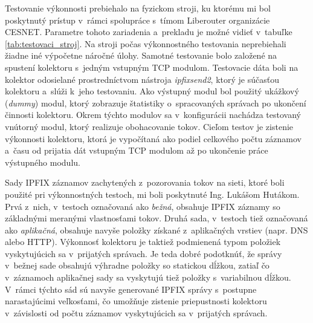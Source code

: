 Testovanie výkonnosti prebiehalo na fyzickom stroji, ku ktorému mi bol poskytnutý prístup v~rámci spolupráce s~tímom Liberouter organizácie CESNET. Parametre tohoto zariadenia a~prekladu je možné vidieť v~tabuľke \ref{tab:testovaci_stroj}. Na stroji počas výkonnostného testovania neprebiehali žiadne iné výpočetne
náročné úlohy. Samotné testovanie bolo založené na spustení kolektoru s~jedným vstupným TCP modulom. Testovacie dáta boli na kolektor odosielané prostredníctvom nástroja \textit{ipfixsend2}, ktorý je súčasťou kolektoru a~slúži k~jeho testovaniu. Ako výstupný modul bol použitý ukážkový
(\textit{dummy}) modul, ktorý zobrazuje štatistiky o~spracovaných správach po ukončení činnosti kolektoru. Okrem týchto modulov sa v~konfigurácii nachádza testovaný vnútorný modul, ktorý realizuje obohacovanie tokov. Cieľom testov je zistenie výkonnosti kolektoru, ktorá je vypočítaná ako podiel
celkového počtu záznamov a~času od prijatia dát vstupným TCP modulom až po ukončenie práce výstupného modulu.

Sady IPFIX záznamov zachytených z~pozorovania tokov na sieti, ktoré boli použité pri výkonnostných testoch, mi boli poskytnuté Ing. Lukášom Hutákom. Prvá z~nich, v~testoch označovaná ako \textit{bežná}, obsahuje IPFIX záznamy so základnými meranými vlastnosťami tokov. Druhá sada,
v~testoch tiež označovaná ako \textit{aplikačná}, obsahuje navyše položky získané z~aplikačných vrstiev (napr. DNS alebo HTTP). Výkonnosť kolektoru je taktiež podmienená typom položiek vyskytujúcich sa v~prijatých správach. Je teda dobré podotknúť, že správy v~bežnej sade obsahujú výhradne položky
so statickou dĺžkou, zatiaľ čo v~záznamoch aplikačnej sady sa vyskytujú tiež položky s~variabilnou dĺžkou. V~rámci týchto sád sú navyše generované IPFIX správy s~postupne narastajúcimi veľkosťami, čo umožňuje zistenie priepustnosti kolektoru v~závislosti od počtu záznamov vyskytujúcich sa v~prijatých
správach.

